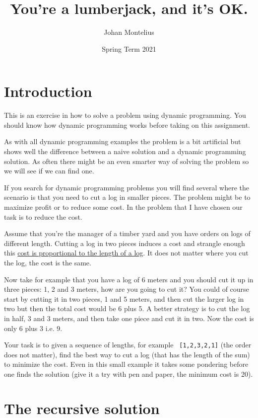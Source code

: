 \documentclass[a4paper,11pt]{article}
\begin{document}
\title{
    \textbf{You're a lumberjack, and it's OK.}
}
\author{Johan Montelius}
\date{Spring Term 2021}
\maketitle
{}

\section*{Introduction}

This is an exercise in how to solve a problem using dynamic
programming. You should know how dynamic programming works before
taking on this assignment.

As with all dynamic programming examples the problem is a bit
artificial but shows well the difference between a naive solution and
a dynamic programming solution. As often there might be an even
smarter way of solving the problem so we will see if we can find one.

If you search for dynamic programming problems you will find several
where the scenario is that you need to cut a log in smaller
pieces. The problem might be to maximize profit or to reduce some
cost. In the problem that I have chosen our task is to reduce the cost.

Assume that you're the manager of a timber yard and you have orders on
logs of different length. Cutting a log in two pieces induces a cost
and strangle enough this \underline{cost is proportional to the length of a
log}. It does not matter where you cut the log, the cost is the same.

Now take for example that you have a log of 6 meters and you should
cut it up in three pieces: 1, 2 and 3 meters, how are you going to cut
it? You could of course start by cutting it in two pieces, 1 and 5
meters, and then cut the larger log in two but then the total cost
would be 6 plus 5. A better strategy is to cut the log in half, 3 and 3
meters, and then take one piece and cut it in two. Now the
cost is only 6 plus 3 i.e. 9.

Your task is to given a sequence of lengths, for example {\tt
  [1,2,3,2,1]} (the order does not matter), find the best way to cut a
log (that has the length of the sum) to minimize the cost. Even in
this small example it takes some pondering before one finds the
solution (give it a try with pen and paper, the minimum cost is 20).


\section*{The recursive solution}
\end{document}
